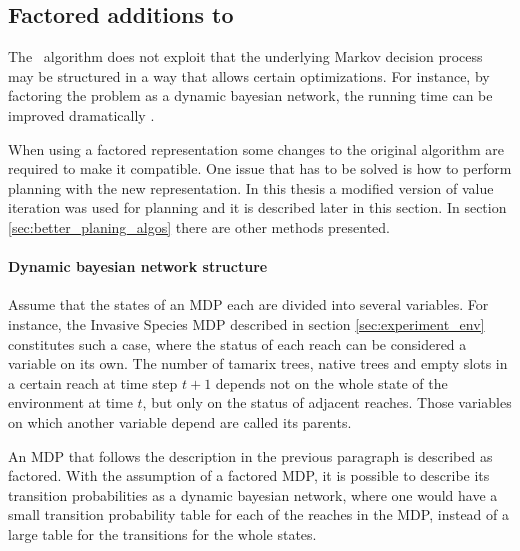 \subsection{Factored additions to \etre}
\label{sec:factored_e3}

The \etre\ algorithm does not exploit that the underlying Markov decision
process may be structured in a way that allows certain optimizations. For instance, 
by factoring the problem as a dynamic bayesian
network, the running time can be improved dramatically 
\parencite{kearns1999efficient}. 

When using a factored representation some changes to the original algorithm are
required to make it compatible. One issue that has to be solved is how to
perform  planning with the new representation. In this thesis a modified version
of value iteration was used for planning and it is described later in this
section. In section \ref{sec:better_planing_algos} there are other methods
presented.


\paragraph{Dynamic bayesian network structure}

Assume that the states of an MDP each are divided into several variables. For
instance, the Invasive Species MDP described in section
\ref{sec:experiment_env} constitutes such a case, where the status of each
reach can be considered a variable on its own. The number of tamarix trees,
native trees and empty slots in a certain reach at time step $t+1$ depends not
on the whole state of the environment at time $t$, but only on the status of
adjacent reaches. Those variables on which another variable depend are called
its parents.  

An MDP that follows the description in the previous paragraph is described as
factored. With the assumption of a factored MDP, it is possible to describe its
transition probabilities as a dynamic bayesian network, where one would have a
small transition probability table for each of the reaches in the MDP, instead
of a large table for the transitions for the whole states.
